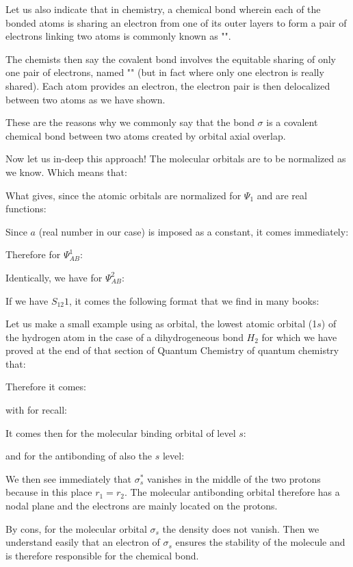 	Let us also indicate that in chemistry, a chemical bond wherein each of the bonded atoms is sharing an electron from one of its outer layers to form a pair of electrons linking two atoms is commonly known as "".
	
	The chemists then say the covalent bond involves the equitable sharing of only one pair of electrons, named "" (but in fact where only one electron is really shared). Each atom provides an electron, the electron pair is then delocalized between two atoms as we have shown.

	These are the reasons why we commonly say that the bond $\sigma$ is a covalent chemical bond between two atoms created by orbital axial overlap.

	Now let us in-deep this approach! The molecular orbitals are to be normalized as we know. Which means that:
	
		What gives, since the atomic orbitals are normalized for $\Psi_1$ and are real functions:
	
	Since $a$ (real number in our case) is imposed as a constant, it comes immediately:
	
	Therefore for $\Psi_{AB}^1$:
	
	Identically, we have for $\Psi_{AB}^2$:
	
	If we have $S_{12} 1$, it comes the following format that we find in many books:
	
	Let us make a small example using as orbital, the lowest atomic orbital (1$s$) of the hydrogen atom in the case of a dihydrogeneous bond $H_2$ for which we have proved at the end of that section of Quantum Chemistry of quantum chemistry that:
	
	Therefore it comes:
	
	with for recall:
	
	It comes then for the molecular binding orbital of level $s$:
	
	and for the antibonding of also the $s$ level:
	
	We then see immediately that $\sigma^*_s$ vanishes in the middle of the two protons because in this place $r_1=r_2$. The molecular antibonding orbital therefore has a nodal plane and the electrons are mainly located on the protons.
	
	By cons, for the molecular orbital $\sigma_s$ the density does not vanish. Then we understand easily that an electron of $\sigma_s$ ensures the stability of the molecule and is therefore responsible for the chemical bond.
	
